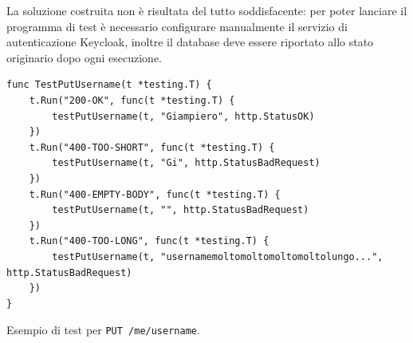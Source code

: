 La soluzione costruita non è risultata del tutto soddisfacente: per poter lanciare il programma di test è necessario configurare manualmente il servizio di autenticazione Keycloak, inoltre il database deve essere riportato allo stato originario dopo ogni esecuzione.

\begin{longlisting}
\begin{verbatim}
func TestPutUsername(t *testing.T) {
	t.Run("200-OK", func(t *testing.T) {
		testPutUsername(t, "Giampiero", http.StatusOK)
	})
	t.Run("400-TOO-SHORT", func(t *testing.T) {
		testPutUsername(t, "Gi", http.StatusBadRequest)
	})
	t.Run("400-EMPTY-BODY", func(t *testing.T) {
		testPutUsername(t, "", http.StatusBadRequest)
	})
	t.Run("400-TOO-LONG", func(t *testing.T) {
		testPutUsername(t, "usernamemoltomoltomoltomoltolungo...", http.StatusBadRequest)
	})
}
\end{verbatim}
\caption{Esempio di test per \texttt{PUT /me/username}.}
\label{listing:impl_test}
\end{longlisting}